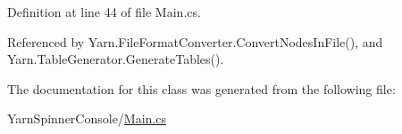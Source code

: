 Definition at line 44 of file Main.\-cs.



Referenced by Yarn.\-File\-Format\-Converter.\-Convert\-Nodes\-In\-File(), and Yarn.\-Table\-Generator.\-Generate\-Tables().



The documentation for this class was generated from the following file\-:\begin{DoxyCompactItemize}
\item 
Yarn\-Spinner\-Console/\hyperlink{a00307}{Main.\-cs}\end{DoxyCompactItemize}
